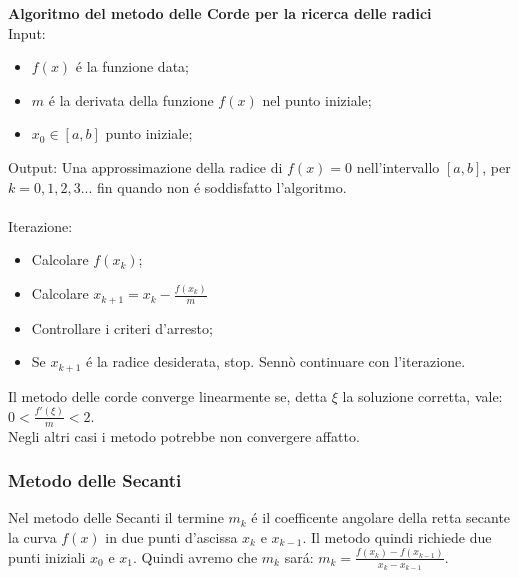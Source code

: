 \documentclass[12pt, letterpaper]{article}
\begin{document}
\textbf{Algoritmo del metodo delle Corde per la ricerca delle radici}\\
Input:
\begin{itemize}
    \item $f(x)$ \'e la funzione data; 
    \item $m$ \'e la derivata della funzione $f(x)$ nel punto iniziale;
    \item $x_0 \in [a,b]$ punto iniziale;
\end{itemize}
Output: Una approssimazione della radice di $f(x)=0$ nell'intervallo $[a,b]$, per $k=0,1,2,3...$ fin quando non \'e soddisfatto l'algoritmo. \\~\\
Iterazione:
\begin{itemize}
    \item Calcolare $f(x_k)$;
    \item Calcolare $x_{k+1}=x_k-\frac{f(x_k)}{m}$
    \item Controllare i criteri d'arresto;
    \item Se $x_{k+1}$ \'e la radice desiderata, stop. Sennò continuare con l'iterazione.
\end{itemize}
Il metodo delle corde converge linearmente se, detta $\xi$ la soluzione corretta, vale: $0<\frac{f'(\xi)}{m}<2.$ \\
Negli altri casi i metodo potrebbe non convergere affatto.

\subsubsection{Metodo delle Secanti}
Nel metodo delle Secanti il termine $m_k$ \'e il coefficente angolare della retta secante la curva $f(x)$ in due punti d'ascissa $x_k$ e $x_{k-1}$. Il metodo quindi richiede due punti iniziali $x_0$ e $x_1$.
Quindi avremo che $m_k$ sar\'a: $m_k = \frac{f(x_k)-f(x_{k-1})}{x_k-x_{k-1}}$.
\end{document}
